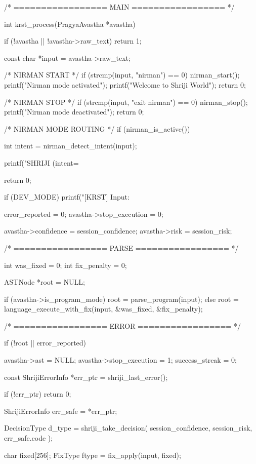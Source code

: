 \documentclass{article}
\begin{document}
/* ================= MAIN ================= */

int krst_process(PragyaAvastha *avastha)
{
    if (!avastha || !avastha->raw_text)
        return 1;

const char *input = avastha->raw_text;

/*  NIRMAN START */
if (strcmp(input, "nirman") == 0) {
    nirman_start();
    printf("Nirman mode activated\n");
    printf("Welcome to Shriji World\n");
    return 0;
}

/*  NIRMAN STOP */
if (strcmp(input, "exit nirman") == 0) {
    nirman_stop();
    printf("Nirman mode deactivated\n");
    return 0;
}

/*  NIRMAN MODE ROUTING */
if (nirman_is_active()) {

    int intent = nirman_detect_intent(input);

    printf("SHRIJI (intent=%

    return 0;
}


    if (DEV_MODE)
        printf("[KRST] Input: %

    error_reported = 0;
    avastha->stop_execution = 0;

    avastha->confidence = session_confidence;
    avastha->risk = session_risk;

    /* ================= PARSE ================= */

    int was_fixed = 0;
    int fix_penalty = 0;

    ASTNode *root = NULL;

    if (avastha->is_program_mode)
        root = parse_program(input);
    else
        root = language_execute_with_fix(input, &was_fixed, &fix_penalty);

    /* ================= ERROR ================= */

    if (!root || error_reported)
    {
        avastha->ast = NULL;
        avastha->stop_execution = 1;
        success_streak = 0;

        const ShrijiErrorInfo *err_ptr = shriji_last_error();

        if (!err_ptr)
            return 0;

        ShrijiErrorInfo err_safe = *err_ptr;

        DecisionType d_type = shriji_take_decision(
            session_confidence,
            session_risk,
            err_safe.code
        );

        char fixed[256];
        FixType ftype = fix_apply(input, fixed);

}}
\end{document}
